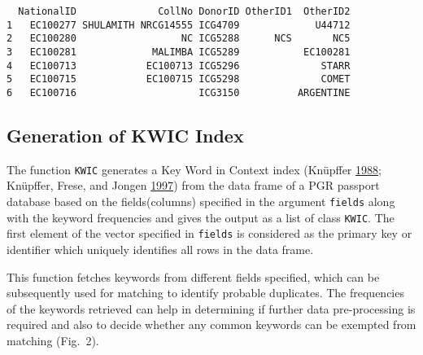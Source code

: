 \documentclass[]{article}
\begin{document}
\begin{verbatim}
  NationalID              CollNo DonorID OtherID1  OtherID2
1   EC100277 SHULAMITH NRCG14555 ICG4709             U44712
2   EC100280                  NC ICG5288      NCS       NC5
3   EC100281             MALIMBA ICG5289           EC100281
4   EC100713            EC100713 ICG5296              STARR
5   EC100715            EC100715 ICG5298              COMET
6   EC100716                     ICG3150          ARGENTINE
\end{verbatim}

\hypertarget{generation-of-kwic-index}{%
\subsection{Generation of KWIC Index}\label{generation-of-kwic-index}}

The function \texttt{KWIC} generates a Key Word in Context index
(Knüpffer \protect\hyperlink{ref-knupffer1988european}{1988}; Knüpffer,
Frese, and Jongen \protect\hyperlink{ref-kfj97}{1997}) from the data
frame of a PGR passport database based on the fields(columns) specified
in the argument \texttt{fields} along with the keyword frequencies and
gives the output as a list of class \texttt{KWIC}. The first element of
the vector specified in \texttt{fields} is considered as the primary key
or identifier which uniquely identifies all rows in the data frame.

This function fetches keywords from different fields specified, which
can be subsequently used for matching to identify probable duplicates.
The frequencies of the keywords retrieved can help in determining if
further data pre-processing is required and also to decide whether any
common keywords can be exempted from matching (Fig.~2).
\end{document}

